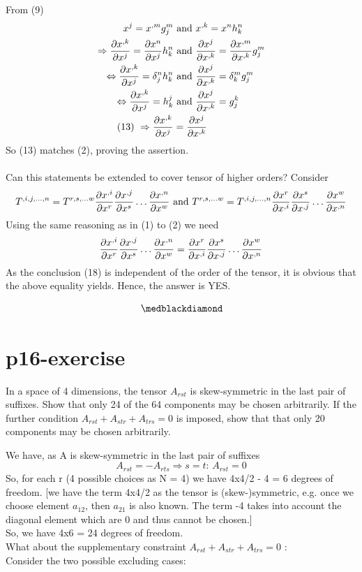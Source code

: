 From (9)
\begin{align}
\ x^{j} = x^{,m} g^m_j &\text{ and } x^{,k} = x^{n} h^n_k\\
\Rightarrow \pdv{x^{,k}}{x^j} = \pdv{x^{n}}{x^j} h^n_k  &\text{ and } \pdv{x^{j}}{x^{,k}} = \pdv{x^{,m}}{x^{,k}}g^m_j\\
\Leftrightarrow \pdv{x^{,k}}{x^j} = \delta^n_j h^n_k  &\text{ and } \pdv{x^{j}}{x^{,k}} = \delta^m_k g^m_j\\
\Leftrightarrow \pdv{x^{,k}}{x^j} = h^j_k  &\text{ and } \pdv{x^{j}}{x^{,k}} = g^k_j\\
\text{(13) }\Rightarrow \pdv{x^{,k}}{x^j} &= \pdv{x^{j}}{x^{,k}}
\end{align}
So (13) matches (2), proving the assertion.\\\\
Can this statements be extended to cover tensor of higher orders?
Consider
$$T^{,i,j,\dots ,n}= T^{r,s,\dots w} \pdv{x^{,i}}{x^{r}}\pdv{x^{,j}}{x^{s}}\dots \pdv{x^{,n}}{x^{w}} \text{ and } T^{r,s,\dots w}= T^{,i,j,\dots ,n} \pdv{x^{r}}{x^{,i}}\pdv{x^{s}}{x^{,j}}\dots \pdv{x^{w}}{x^{,n}}$$
Using the same reasoning as in (1) to (2) we need
$$\pdv{x^{,i}}{x^{r}}\pdv{x^{,j}}{x^{s}}\dots \pdv{x^{,n}}{x^{w}} =\pdv{x^{r}}{x^{,i}}\pdv{x^{s}}{x^{,j}}\dots \pdv{x^{w}}{x^{,n}}$$
As the conclusion (18) is independent of the order of the tensor, it is obvious that the above equality yields. Hence, the answer is YES.

$$\medblackdiamond$$
\pagebreak[4]

\section{p16-exercise}

\begin{tcolorbox}
In a space of 4 dimensions, the tensor $A_{rst}$ is skew-symmetric in the last pair of suffixes. Show that only 24 of the 64 components may be chosen arbitrarily. If the further condition
$A_{rst} + A_{str}+A_{trs} =0$
is imposed, show that that only 20 components may be chosen arbitrarily.

\end{tcolorbox}
We have, as A is skew-symmetric in the last pair of suffixes
$$A_{rst} = -A_{rts}  \Rightarrow s=t \text{: } A_{rst} = 0 $$
So, for each r (4 possible choices as N = 4) we have 4x4/2 - 4 = 6 degrees of freedom. [we have the term 4x4/2  as the tensor is (skew-)symmetric, e.g. once we choose element $a_{12}$, then $a_{21}$ is also known. The term -4 takes into account the diagonal element which are 0 and thus cannot be chosen.]\\
So, we have 4x6 = 24 degrees of freedom.\\
What about the supplementary constraint $A_{rst} + A_{str}+A_{trs} =0 $       :\\
Consider the two possible excluding cases:\\

